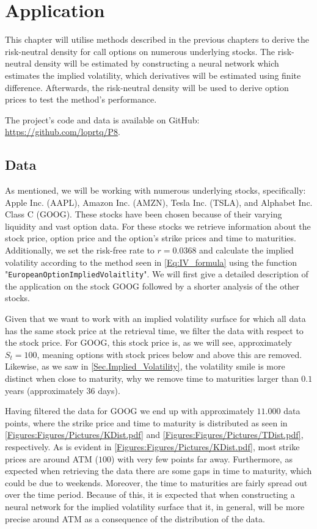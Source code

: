 \chapter{Application}\label{Ch.5}
This chapter will utilise methods described in the previous chapters to derive the risk-neutral density for call options on numerous underlying stocks. The risk-neutral density will be estimated by constructing a neural network which estimates the implied volatility, which derivatives will be estimated using finite difference. Afterwards, the risk-neutral density will be used to derive option prices to test the method's performance.

The project's code and data is available on GitHub: \url{https://github.com/loprtq/P8}.


\section*{Data}
As mentioned, we will be working with numerous underlying stocks, specifically: Apple Inc. (AAPL), Amazon Inc. (AMZN), Tesla Inc. (TSLA), and Alphabet Inc. Class C (GOOG). These stocks have been chosen because of their varying liquidity and vast option data. For these stocks we retrieve information about the stock price, option price and the option's strike prices and time to maturities. Additionally, we set the risk-free rate to $r=0.0368$ and calculate the implied volatility according to the method seen in \eqref{Eq:IV_formula} using the function "\lstinline{EuropeanOptionImpliedVolaitlity}". We will first give a detailed description of the application on the stock GOOG followed by a shorter analysis of the other stocks.

Given that we want to work with an implied volatility surface for which all data has the same stock price at the retrieval time, we filter the data with respect to the stock price. For GOOG, this stock price is, as we will see, approximately $S_t=100$, meaning options with stock prices below and above this are removed. Likewise, as we saw in \autoref{Sec.Implied_Volatility}, the volatility smile is more distinct when close to maturity, why we remove time to maturities larger than $0.1$ years (approximately 36 days).

Having filtered the data for GOOG we end up with approximately $11.000$ data points, where the strike price and time to maturity is distributed as seen in \autoref{Figures:Figures/Pictures/KDist.pdf} and \autoref{Figures:Figures/Pictures/TDist.pdf}, respectively. As is evident in \autoref{Figures:Figures/Pictures/KDist.pdf}, most strike prices are around ATM ($100$) with very few points far away. Furthermore, as expected when retrieving the data there are some gaps in time to maturity, which could be due to weekends. Moreover, the time to maturities are fairly spread out over the time period. Because of this, it is expected that when constructing a neural network for the implied volatility surface that it, in general, will be more precise around ATM as a consequence of the distribution of the data. 

